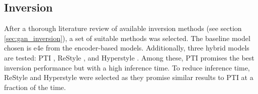 \subsection{Inversion}\label{sec:method_gan_inversion}
After a thorough literature review of available inversion methods (see section \ref{sec:gan_inversion}), a set of suitable methods was selected. The baseline model chosen is e4e \citep{tov2021designing} from the encoder-based models. Additionally, three hybrid models are tested: PTI \citep{roich2022pivotal}, ReStyle \citep{alaluf2021restyle}, and Hyperstyle \citep{alaluf2022hyperstyle}. Among these, PTI promises the best inversion performance but with a high inference time. To reduce inference time, ReStyle and Hyperstyle were selected as they promise similar results to PTI at a fraction of the time.

